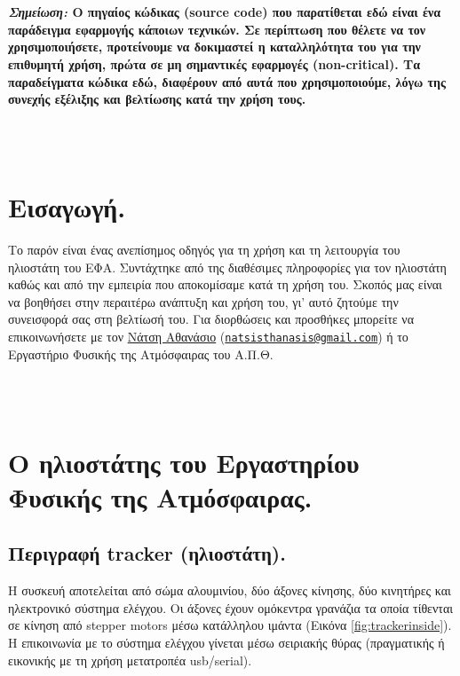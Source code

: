 \documentclass[
  a4paper,
  twoside,
  titlepage,
  12pt]{article}
\numberwithin{equation}{section}
\numberwithin{figure}{section}
\numberwithin{table}{section}
\begin{document}
~
\vfill ~
~

~
\vfill ~
~

\textbf{\emph{Σημείωση:} Ο πηγαίος κώδικας (source code) που παρατίθεται εδώ είναι ένα παράδειγμα εφαρμογής κάποιων τεχνικών. Σε περίπτωση που θέλετε να τον χρησιμοποιήσετε, προτείνουμε να δοκιμαστεί η καταλληλότητα του για την επιθυμητή χρήση, πρώτα σε μη σημαντικές εφαρμογές (non-critical). Τα παραδείγματα κώδικα εδώ, διαφέρουν από αυτά που χρησιμοποιούμε, λόγω της συνεχής εξέλιξης και βελτίωσης κατά την χρήση τους.}

\newpage

~\\
\vfill
~\\

\hypertarget{intro}{%
\section*{Εισαγωγή.}\label{intro}}

Το παρόν είναι ένας ανεπίσημος οδηγός για τη χρήση και τη λειτουργία του ηλιοστάτη του ΕΦΑ. Συντάχτηκε από της διαθέσιμες πληροφορίες για τον ηλιοστάτη καθώς και από την εμπειρία που αποκομίσαμε κατά τη χρήση του. Σκοπός μας είναι να βοηθήσει στην περαιτέρω ανάπτυξη και χρήση του, γι' αυτό ζητούμε την συνεισφορά σας στη βελτίωσή του. Για διορθώσεις και προσθήκες μπορείτε να επικοινωνήσετε με τον \href{mailto:natsisthanasis@gmail.com}{Νάτση Αθανάσιο} (\href{mailto:natsisthanasis@gmail.com}{\nolinkurl{natsisthanasis@gmail.com}}) ή το Εργαστήριο Φυσικής της Ατμόσφαιρας του Α.Π.Θ.

~\\
\vfill
~\\

\newpage

\hypertarget{tracker}{%
\section{Ο ηλιοστάτης του Εργαστηρίου Φυσικής της Ατμόσφαιρας.}\label{tracker}}

\hypertarget{trackerdescription}{%
\subsection{Περιγραφή tracker (ηλιοστάτη).}\label{trackerdescription}}

Η συσκευή αποτελείται από σώμα αλουμινίου, δύο άξονες κίνησης, δύο κινητήρες και ηλεκτρονικό σύστημα ελέγχου.
Οι άξονες έχουν ομόκεντρα γρανάζια τα οποία τίθενται σε κίνηση από stepper motors μέσω κατάλληλου ιμάντα (Εικόνα \ref{fig:trackerinside}).
Η επικοινωνία με το σύστημα ελέγχου γίνεται μέσω σειριακής θύρας (πραγματικής ή εικονικής με τη χρήση μετατροπέα usb/serial).
\end{document}
